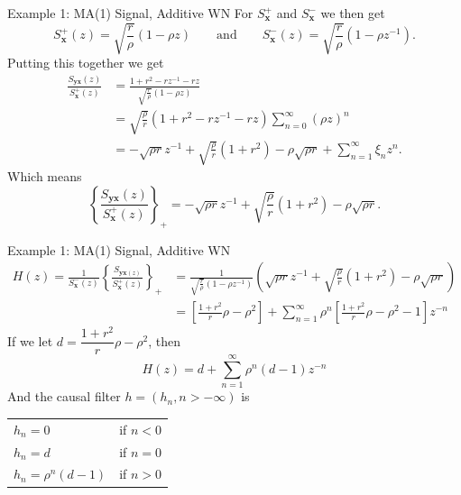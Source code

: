 \documentclass{beamer}  %
\renewcommand{\and}{\qquad \text{and}\qquad}
\begin{document}

\begin{frame}{Example 1: MA(1) Signal, Additive WN}
	For  $S^+_{\textbf{x}}$ and $S^-_{\textbf{x}}$ we then get
	$$S^+_{\textbf{x}}(z) = \sqrt{\frac{r}{\rho}}  (1-\rho z) \and S^-_{\textbf{x}}(z) = \sqrt{\frac{r}{\rho}}  (1-\rho z^{-1}).$$
	Putting this together we get
	\begin{align*}
	\frac{S_{\textbf{yx}}(z)}{S^+_{\textbf{x}}(z)}&= \frac{1 + r^2 -rz^{-1} - rz }{\sqrt{\frac{r}{\rho}}  (1-\rho z)}\\
	&= \sqrt{\frac{\rho}{r}}(1 + r^2 -rz^{-1} - rz)\sum_{n=0}^\infty (\rho z)^n\\
	&= -\sqrt{\rho r}z^{-1} +\sqrt{\frac{\rho}{r}}(1+r^2) - \rho \sqrt{\rho r} + \sum_{n=1}^\infty  \xi_n z^n.
	\end{align*}
	Which means
	$$
	\left\{\frac{S_{\textbf{yx}}(z)}{S^+_{\textbf{x}}(z)}\right\}_+ =-\sqrt{\rho r}z^{-1} +\sqrt{\frac{\rho}{r}}(1+r^2) - \rho \sqrt{\rho r}.$$
	
\end{frame}	


\begin{frame}{Example 1: MA(1) Signal, Additive WN}
	\begin{align*}
	H(z) = \frac{1}{S^-_{\textbf{x}}(z)} \left\{\frac{S_{\textbf{yx}(z)}}{S^+_{\textbf{x}}(z)}\right\}_+ &= \frac{1}{\sqrt{\frac{r}{\rho}}  (1-\rho z^{-1})}\left( \sqrt{\rho r}z^{-1} +\sqrt{\frac{\rho}{r}}(1+r^2) - \rho \sqrt{\rho r}\right) \\
	&= \left[\frac{1+r^2}{r}\rho - \rho^2\right] + \sum_{n=1}^\infty \rho^n \left[\frac{1+r^2}{r}\rho - \rho^2 - 1\right]z^{-n}
	\end{align*}
	If we let $d = \dfrac{1+r^2}{r}\rho - \rho^2 $, then
	$$H(z) = d + \sum_{n=1}^\infty \rho^n (d-1)z^{-n}$$
	And the causal filter $h = (h_n, n > -\infty)$ is 
	\begin{center}
		\begin{tabular}{l @{\qquad} r}
			$ h_n = 0 $ & if $n<0$ \\
			$ h_n = d $ & if $n=0$ \\
			$ h_n = \rho^n(d-1) $ & if $n>0$
		\end{tabular}
	\end{center}
\end{frame}
\end{document}
